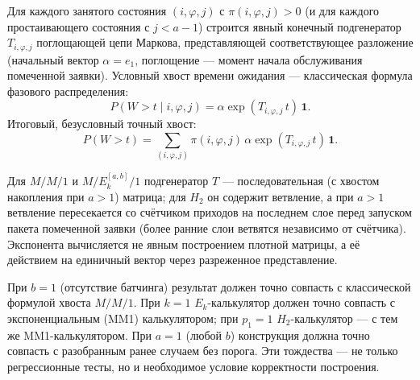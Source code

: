 \documentclass[12pt,a4paper]{article}
\begin{document}
Для каждого занятого состояния $(i,\varphi,j)$ с $\pi(i,\varphi,j)>0$ (и для каждого простаивающего состояния с $j<a-1$) строится явный конечный подгенератор $T_{i,\varphi,j}$ поглощающей цепи Маркова, представляющей соответствующее разложение (начальный вектор $\alpha=e_1$, поглощение --- момент начала обслуживания помеченной заявки). Условный хвост времени ожидания --- классическая формула фазового распределения:
\begin{equation}
P(W>t \mid i,\varphi,j) = \alpha\exp(T_{i,\varphi,j}\,t)\,\mathbf{1}.
\label{eq:conditional-tail}
\end{equation}
Итоговый, безусловный точный хвост:
\begin{equation}
P(W>t) = \sum_{(i,\varphi,j)} \pi(i,\varphi,j)\,\alpha\exp(T_{i,\varphi,j}\,t)\,\mathbf{1}.
\label{eq:total-tail}
\end{equation}

Для $M/M/1$ и $M/E_k^{[a,b]}/1$ подгенератор $T$ --- последовательная (с хвостом накопления при $a>1$) матрица; для $H_2$ он содержит ветвление, а при $a>1$ ветвление пересекается со счётчиком приходов на последнем слое перед запуском пакета помеченной заявки (более ранние слои ветвятся независимо от счётчика). Экспонента вычисляется не явным построением плотной матрицы, а её действием на единичный вектор через разреженное представление.

При $b=1$ (отсутствие батчинга) результат должен точно совпасть с классической формулой хвоста $M/M/1$. При $k=1$ $E_k$-калькулятор должен точно совпасть с экспоненциальным (MM1) калькулятором; при $p_1=1$ $H_2$-калькулятор --- с тем же MM1-калькулятором. При $a=1$ (любой $b$) конструкция должна точно совпасть с разобранным ранее случаем без порога. Эти тождества --- не только регрессионные тесты, но и необходимое условие корректности построения.
\end{document}
